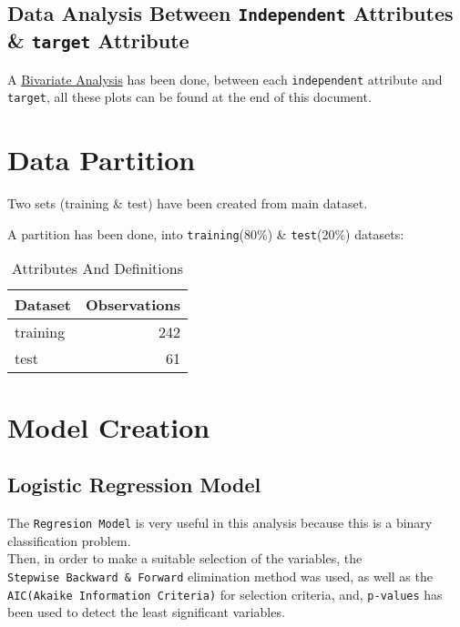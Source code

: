 \documentclass[]{article}
\begin{document}
\hypertarget{data-analysis-between-independent-attributes-target-attribute}{%
\subsection{\texorpdfstring{Data Analysis Between \texttt{Independent}
Attributes \& \texttt{target}
Attribute}{Data Analysis Between Independent Attributes \& target Attribute}}\label{data-analysis-between-independent-attributes-target-attribute}}

A \protect\hyperlink{barplots}{Bivariate Analysis} has been done,
between each \texttt{independent} attribute and \texttt{target}, all
these plots can be found at the end of this document.

\hypertarget{data-partition}{%
\section{Data Partition}\label{data-partition}}

Two sets (training \& test) have been created from main dataset.

A partition has been done, into \texttt{training}(80\%) \&
\texttt{test}(20\%) datasets:

\begin{table}[!h]

\caption{\label{tab:table.data.set.partition}Attributes And Definitions}
\centering
\begin{tabular}{lr}
\toprule
Dataset & Observations\\
\midrule
\rowcolor{gray!6}  training & 242\\
test & 61\\
\bottomrule
\end{tabular}
\end{table}

\pagebreak

\hypertarget{model-creation}{%
\section{Model Creation}\label{model-creation}}

\hypertarget{logistic-regression-model}{%
\subsection{Logistic Regression Model}\label{logistic-regression-model}}

The \texttt{Regresion\ Model} is very useful in this analysis because
this is a binary classification problem.\\
Then, in order to make a suitable selection of the variables, the
\texttt{Stepwise\ Backward\ \&\ Forward} elimination method was used, as
well as the \texttt{AIC(Akaike\ Information\ Criteria)} for selection
criteria, and, \texttt{p-values} has been used to detect the least
significant variables.
\end{document}
